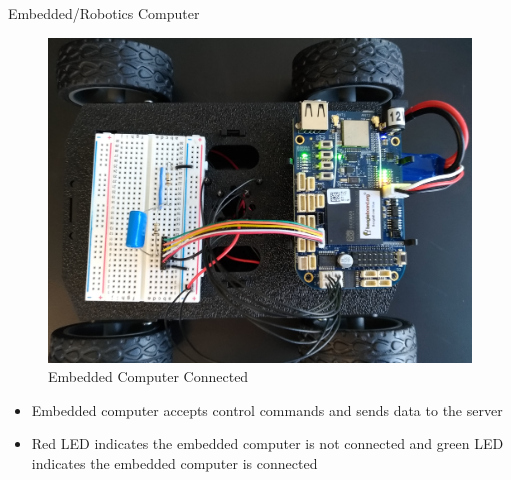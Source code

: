 \documentclass{beamer}
\begin{document}
\begin{frame}{Embedded/Robotics Computer}{}
\begin{multicols}{2}
        \begin{figure}
            \centering
            \includegraphics[scale=0.04]{figs/beaglebone/connectedSBC.jpg}
            \caption{Embedded Computer Connected}
            \label{fig:connected_bb}
        \end{figure}
    \end{multicols}
    \begin{block}{}
      \begin{small}
        \begin{itemize}
            \item Embedded computer accepts control commands and sends data to the server
            \item Red LED indicates the embedded computer is not connected and green LED indicates the embedded computer is connected
        \end{itemize}
      \end{small}
    \end{block}
\end{frame}
\end{document}

